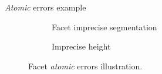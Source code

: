 \documentclass{beamer}
\begin{document}
\begin{frame}{\emph{Atomic} errors example}
{\begin{figure}
\begin{center}
\begin{subfigure}{.28\textwidth}
                            \end{subfigure}
                            \hspace{10pt}
                            \begin{subfigure}{.28\textwidth}
                                \caption{\label{fig::fac_footprint} Facet imprecise segmentation}
                            \end{subfigure}
                            \hspace{10pt}
                            \begin{subfigure}{.28\textwidth}
                                \caption{\label{fig::fac_height} Imprecise height}
                            \end{subfigure}
                            \caption{Facet \emph{atomic} errors illustration.}
                        \end{center}
                    \end{figure}
                }
            \end{frame}
\end{document}
